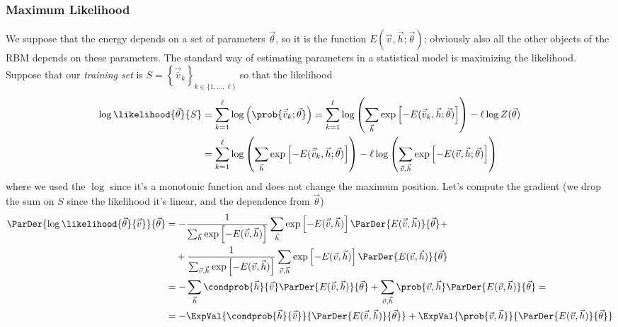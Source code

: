 \documentclass[]{article}
\begin{document}
  \subsubsection{Maximum Likelihood}
  We suppose that the energy depends on a set of parameters \(\vec{\theta}\), so it is the function
  \(E(\vec{v}, \vec{h};\vec{\theta})\); obviously also all the other objects of the RBM depends on these parameters. The standard way of estimating parameters in a statistical
  model is maximizing the likelihood. Suppose that our \emph{training set} is 
  \(S = \left\{\vec{\bar{v}}_k\right\}_{k \in \{1,\dots,\ell\}}\) so that the likelihood
  \begin{align*}
    \log\likelihood{\vec{\theta}}{S}
      &= \sum_{k=1}^\ell \log\left(\prob{\vec{\bar{v}}_k;\vec{\theta}}\right)
       = \sum_{k=1}^\ell \log\left(\sum_{\vec{h}} 
                                      \exp\left[-E(\vec{\bar{v}}_k,\vec{h};\vec{\theta})\right]\right)
         -\ell \log{Z(\vec{\theta})} \\
      &= \sum_{k=1}^\ell \log\left(\sum_{\vec{h}} 
                                      \exp\left[-E(\vec{\bar{v}}_k,\vec{h};\vec{\theta})\right]\right)
         -\ell \log\left(\sum_{\vec{v},\vec{h}} 
                                 \exp\left[-E(\vec{v},\vec{h};\vec{\theta})\right]\right)
   \end{align*}
   where we used the \(\log\) since it's a monotonic function and does not change the maximum position.
  Let's compute the gradient (we drop the sum on \(S\) since the likelihood it's linear, and the dependence from \(\vec{\theta}\))
  \begin{align*} \displaystyle
    \ParDer{\log\likelihood{\vec{\theta}}{\vec{\bar{v}}}}{\vec{\theta}}
      &= -\frac{1}{\sum_{\vec{h}}\exp\left[-E(\vec{\bar{v}},\vec{h})\right]}
          \sum_{\vec{h}}\exp\left[-E(\vec{\bar{v}},\vec{h})\right]
          \ParDer{E(\vec{\bar{v}},\vec{h})}{\vec{\theta}}+ \\
      &\quad +\frac{1}{\sum_{\vec{v},\vec{h}}\exp\left[-E(\vec{v},\vec{h})\right]}
          \sum_{\vec{v},\vec{h}}\exp\left[-E(\vec{v},\vec{h})\right]
          \ParDer{E(\vec{v},\vec{h})}{\vec{\theta}} \\
      &= -\sum_{\vec{h}}\condprob{\vec{h}}{\vec{\bar{v}}}
        \ParDer{E(\vec{\bar{v}},\vec{h})}{\vec{\theta}} +
        \sum_{\vec{v},\vec{h}}\prob{\vec{v},\vec{h}}
        \ParDer{E(\vec{v},\vec{h})}{\vec{\theta}} =\\
      &= -\ExpVal{\condprob{\vec{h}}{\vec{\bar{v}}}}{\ParDer{E(\vec{\bar{v}},\vec{h})}{\vec{\theta}}}
         +\ExpVal{\prob{\vec{v},\vec{h}}}{\ParDer{E(\vec{v},\vec{h})}{\vec{\theta}}}
  \end{align*}
  
\end{document}
